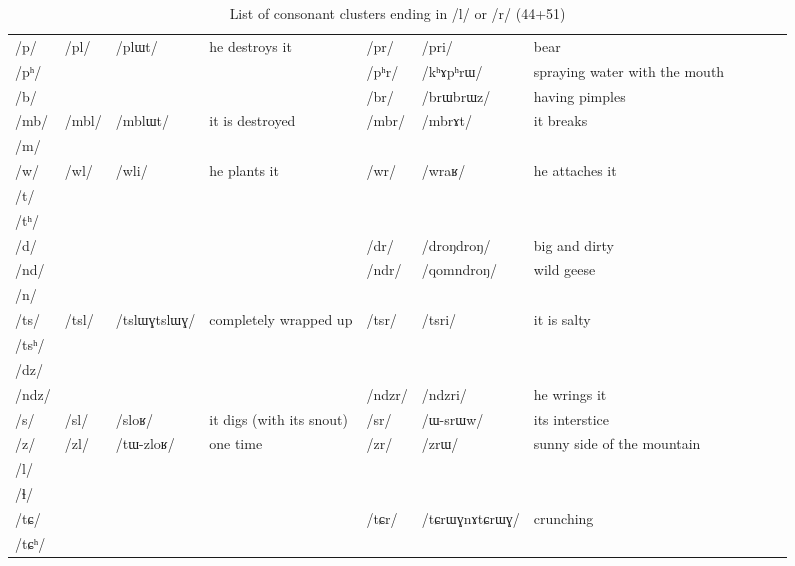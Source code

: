 \documentclass[oldfontcommands,oneside,a4paper,11pt]{article}
\newcommand{\ipa}[1]{\mbox{/#1/}} %
\newcommand{\deux}[1]{/#1/}
\newcommand{\tib}[1]{\cellcolor{lightgray}\textbf{#1}}
\newcommand{\idph}[1]{\cellcolor{gray}\textbf{#1}}
\begin{document}
\begin{landscape}
   \begin{longtable}{l|lll|lll|lll|l}
 \caption{List of consonant clusters ending in \ipa{l} or \ipa{r} (44+51)} \\%
\toprule
  \ipa{p} 	& \deux{pl} 	& \ipa{plɯt} 	& he destroys it 	& \deux{pr} 	& \ipa{pri} 	& bear\\	
\ipa{pʰ} 	&  	&  	&  	& \deux{pʰr} 	& \ipa{kʰɤpʰrɯ} 	& spraying water with the mouth\\	
\ipa{b} 	&  	&  	&  	& \deux{br} \idph{}	& \ipa{brɯbrɯz} 	& having pimples\\	
\ipa{mb} 	& \deux{mbl} 	& \ipa{mblɯt} 	& it is destroyed 	& \deux{mbr} 	& \ipa{mbrɤt} 	&it breaks \\	
\ipa{m} 	&  	&  	&  	&  	&  	& \\	
\ipa{w} 	& \deux{wl} 	& \ipa{wli} 	&he plants it  	& \deux{wr} 	& \ipa{wraʁ} 	&he attaches it \\	
\ipa{t} 	&  	&  	&  	&  	&  	& \\	
\ipa{tʰ} 	&  	&  	&  	&  	&  	& \\	
\ipa{d} 	&  	&  	&  	& \deux{dr} \idph{}	& \ipa{droŋdroŋ} 	& big and dirty\\	
\ipa{nd} 	&  	&  	&  	& \deux{ndr} 	& \ipa{qomndroŋ} 	& wild geese\\	
\ipa{n} 	&  	&  	&  	&  	&  	& \\	
\ipa{ts}  	& \deux{tsl}\idph{} 	& \ipa{tslɯɣtslɯɣ} 	& completely wrapped up 	& \deux{tsr} 	& \ipa{tsri} 	& it is salty\\	
\ipa{tsʰ} 	&  	&  	&  	&  	&  	& \\	
\ipa{dz} 	&  	&  	&  	&  	&  	& \\	
\ipa{ndz} 	&  	&  	&  	& \deux{ndzr} 	& \ipa{ndzri} 	& he wrings it\\	
\ipa{s} 	& \deux{sl} 	& \ipa{sloʁ} 	& it digs (with its snout) 	& \deux{sr} 	& \ipa{ɯ-srɯw} 	&its interstice \\	
\ipa{z} 	& \deux{zl} \tib{} 	& \ipa{tɯ-zloʁ} 	& one time 	& \deux{zr} 	& \ipa{zrɯ} 	&sunny side of the mountain \\	
\ipa{l} 	&  	&  	&  	&  	&  	& \\	
\ipa{ɬ} 	&  	&  	&  	&  	&  	& \\	
\ipa{tɕ} 	&  	&  	&  	& \deux{tɕr} \idph{}	& \ipa{tɕrɯɣnɤtɕrɯɣ} 	& crunching\\	
\ipa{tɕʰ} 	&  	&  	&  	&  	&  	& \\	

\end{longtable}
\end{landscape}
\end{document}
